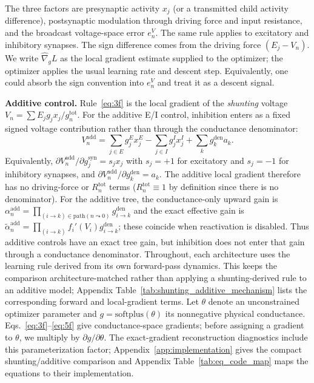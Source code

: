     The three factors are presynaptic activity $x_j$ (or a transmitted child activity difference), postsynaptic modulation through driving force and input resistance, and the broadcast voltage-space error $e_n^V$.
    The same rule applies to excitatory and inhibitory synapses. The sign difference comes from the driving force $(E_j - V_n)$.
    We write $\widehat{\nabla}_g L$ as the local gradient estimate supplied to the optimizer; the optimizer applies the usual learning rate and descent step. Equivalently, one could absorb the sign convention into $e_n^V$ and treat it as a descent signal.
    
    \noindent\textbf{Additive control.}
    Rule~\eqref{eq:3f} is the local gradient of the \emph{shunting} voltage $V_n = \sum E_j g_j x_j / g_n^{\mathrm{tot}}$.
    For the additive E/I control, inhibition enters as a fixed signed voltage contribution rather than through the conductance denominator:
    \[
    V_n^{\mathrm{add}}=\sum_{j\in E}g_j^E x_j^E-\sum_{j\in I}g_j^I x_j^I+\sum_k g_k^{\mathrm{den}}a_k .
    \]
    Equivalently, $\partial V_n^{\mathrm{add}}/\partial g_j^{\mathrm{syn}}=s_jx_j$ with $s_j=+1$ for excitatory and $s_j=-1$ for inhibitory synapses, and $\partial V_n^{\mathrm{add}}/\partial g_k^{\mathrm{den}}=a_k$. The additive local gradient therefore has no driving-force or $R_n^{\mathrm{tot}}$ terms ($R_n^{\mathrm{tot}}\equiv1$ by definition since there is no denominator).
    For the additive tree, the conductance-only upward gain is $\alpha_n^{\mathrm{add}}=\prod_{(i\to k)\in\mathrm{path}(n\leadsto0)}g_{i\to k}^{\mathrm{den}}$ and the exact effective gain is $\tilde{\alpha}_n^{\mathrm{add}}=\prod_{(i\to k)}f_i'(V_i)g_{i\to k}^{\mathrm{den}}$; these coincide when reactivation is disabled. Thus additive controls have an exact tree gain, but inhibition does not enter that gain through a conductance denominator.
    Throughout, each architecture uses the learning rule derived from its own forward-pass dynamics. This keeps the comparison architecture-matched rather than applying a shunting-derived rule to an additive model; Appendix Table~\ref{tab:shunting_additive_mechanism} lists the corresponding forward and local-gradient terms.
    Let $\theta$ denote an unconstrained optimizer parameter and $g=\mathrm{softplus}(\theta)$ its nonnegative physical conductance. Eqs.~\eqref{eq:3f}--\eqref{eq:5f} give conductance-space gradients; before assigning a gradient to $\theta$, we multiply by $\partial g/\partial\theta$. The exact-gradient reconstruction diagnostics include this parameterization factor; Appendix~\ref{app:implementation} gives the compact shunting/additive comparison and Appendix Table~\ref{tab:eq_code_map} maps the equations to their implementation.
    
